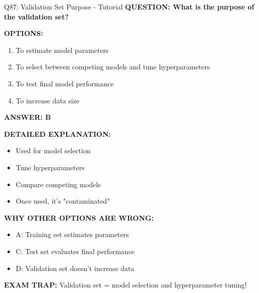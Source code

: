 \documentclass[8pt]{beamer}
\begin{document}
	\begin{frame}{Q87: Validation Set Purpose - Tutorial}
		\fontsize{6.5}{7.5}\selectfont
		\textbf{QUESTION: What is the purpose of the validation set?}
		
		\vspace{0.1cm}
		\textbf{OPTIONS:}
		\begin{enumerate}
			\item To estimate model parameters
			\item To select between competing models and tune hyperparameters
			\item To test final model performance
			\item To increase data size
		\end{enumerate}
		
		\vspace{0.1cm}
		\textcolor{myblue}{\textbf{ANSWER: B}}
		
		\vspace{0.1cm}
		\textbf{DETAILED EXPLANATION:}
		\begin{itemize}
			\item Used for model selection
			\item Tune hyperparameters
			\item Compare competing models
			\item Once used, it's "contaminated"
		\end{itemize}
		
		\vspace{0.1cm}
		\textcolor{myred}{\textbf{WHY OTHER OPTIONS ARE WRONG:}}
		\begin{itemize}
			\item \textcolor{myred}{A:} Training set estimates parameters
			\item \textcolor{myred}{C:} Test set evaluates final performance
			\item \textcolor{myred}{D:} Validation set doesn't increase data
		\end{itemize}
		
		\textcolor{myred}{\textbf{EXAM TRAP:}} Validation set = \textcolor{myblue}{model selection and hyperparameter tuning}!
	\end{frame}
	
\end{document}

